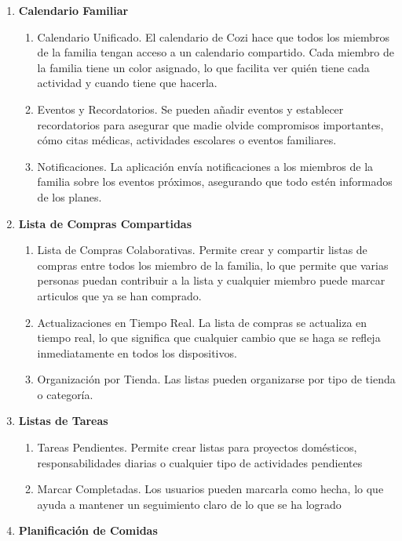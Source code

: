 \documentclass{article}
\begin{document}
\begin{enumerate}
    \item \textbf{Calendario Familiar}
    \begin{enumerate}
        \item Calendario Unificado. El calendario de Cozi hace que todos los miembros de la familia tengan acceso a un calendario compartido. 
        Cada miembro de la familia tiene un color asignado, lo que facilita ver quién tiene cada actividad y cuando tiene que hacerla.
        \item Eventos y Recordatorios. Se pueden añadir eventos y establecer recordatorios para asegurar que madie olvide compromisos importantes, cómo
        citas médicas, actividades escolares o eventos familiares.
        \item Notificaciones. La aplicación envía notificaciones a los miembros de la familia sobre los eventos próximos, asegurando que todo estén informados de los planes.
    \end{enumerate}
    \item \textbf{Lista de Compras Compartidas}
    \begin{enumerate}
        \item Lista de Compras Colaborativas. Permite crear y compartir listas de compras entre todos los miembro de la familia, 
        lo que permite que varias personas puedan contribuir a la lista y cualquier miembro puede marcar articulos que ya se han comprado. 
        \item Actualizaciones en Tiempo Real. La lista de compras se actualiza en tiempo real, lo que significa que cualquier cambio que se haga se refleja inmediatamente en todos los dispositivos.
        \item Organización por Tienda. Las listas pueden organizarse por tipo de tienda o categoría.
    \end{enumerate}
    \item \textbf{Listas de Tareas}
    \begin{enumerate}
        \item Tareas Pendientes. Permite crear listas para proyectos domésticos, responsabilidades diarias o cualquier tipo de actividades pendientes
        \item Marcar Completadas. Los usuarios pueden marcarla como hecha, lo que ayuda a mantener un seguimiento claro de lo que se ha logrado
    \end{enumerate}
    \item \textbf{Planificación de Comidas}

\end{enumerate}
\end{document}
